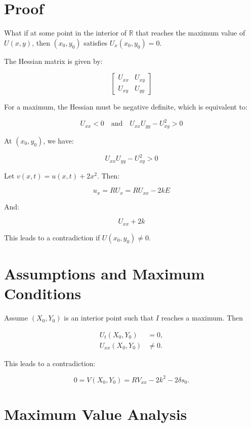 \documentclass[11pt]{article}
\begin{document}




\section*{Proof}

What if at some point in the interior of $\mathbb{R}$ that reaches the maximum value of $U(x, y)$, then $(x_0, y_0)$ satisfies $U_x(x_0, y_0) = 0$.

The Hessian matrix is given by:

\[
\begin{bmatrix}
U_{xx} & U_{xy} \\
U_{xy} & U_{yy}
\end{bmatrix}
\]

For a maximum, the Hessian must be negative definite, which is equivalent to:

\[
U_{xx} < 0 \quad \text{and} \quad U_{xx}U_{yy} - U_{xy}^2 > 0
\]

At $(x_0, y_0)$, we have:

\[
U_{xx}U_{yy} - U_{xy}^2 > 0
\]

Let $v(x, t) = u(x, t) + 2x^2$. Then:

\[
u_x = R U_x = R U_{xx} - 2kE
\]

And:

\[
U_{xx} + 2k
\]

This leads to a contradiction if $U(x_0, y_0) \neq 0$.





\section*{Assumptions and Maximum Conditions}

Assume $(X_0, Y_0)$ is an interior point such that $I$ reaches a maximum. Then

\begin{align}
    U_t(X_0, Y_0) &= 0, \\
    U_{xx}(X_0, Y_0) &\neq 0.
\end{align}

This leads to a contradiction:

\begin{equation}
    0 = V(X_0, Y_0) = R V_{xx} - 2k^2 - 2\delta s_0.
\end{equation}

\section*{Maximum Value Analysis}
\end{document}
